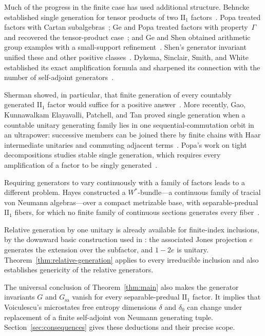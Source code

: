 Much of the progress in the finite case has used additional structure.
Behncke established single generation for tensor products of two
$\mathrm{II}_1$ factors~\cite{Behncke1972}.
Popa treated factors with Cartan subalgebras~\cite{Popa1985Cartan};
Ge and Popa treated factors with property~$\Gamma$ and recovered the
tensor-product case~\cite{GePopa1998}; and Ge and Shen obtained
arithmetic group examples with a small-support
refinement~\cite{GeShen2002}.
Shen's generator invariant unified these and other positive
classes~\cite{Shen2009}. Dykema, Sinclair, Smith, and White established
its exact amplification formula and sharpened its connection with the
number of self-adjoint generators~\cite{DSSW2008}.

Sherman showed, in particular, that finite generation of every
countably generated $\mathrm{II}_1$ factor would suffice for a positive
answer~\cite[Theorem~3.8(3)]{Sherman2012}.
More recently, Gao, Kunnawalkam Elayavalli, Patchell, and Tan proved
single generation when a countable unitary generating family lies in
one sequential-commutation orbit in an ultrapower: successive
members can be joined there by finite chains with Haar intermediate
unitaries and commuting adjacent terms~\cite[Theorem~A]{GaoEtAl2025}. Popa's work on tight
decompositions studies stable single generation, which requires every
amplification of a factor to be singly generated~\cite{Popa2021Tight}.

Requiring generators to vary continuously with a family of factors
leads to a different problem. Hayes constructed a $W^*$-bundle---a
continuous family of tracial von Neumann algebras---over a compact
metrizable base, with separable-predual $\mathrm{II}_1$ fibers, for
which no finite family of continuous sections generates every
fiber~\cite[Theorem~1.1]{Hayes2026Bundles}.

Relative generation by one unitary is already available for finite-index
inclusions, by the downward basic construction used in
\cite[Lemma~6.2]{DSSW2008}: the associated Jones projection $e$
generates the extension over the subfactor, and $1-2e$ is unitary.
Theorem~\ref{thm:relative-generation} applies to every irreducible
inclusion and also establishes genericity of the relative generators.

The universal conclusion of Theorem~\ref{thm:main} also makes the
generator invariants $G$ and $G_{\mathrm{sa}}$ vanish for every
separable-predual $\mathrm{II}_1$ factor. It implies that Voiculescu's
microstates free entropy dimensions $\delta$ and $\delta_0$ can change
under replacement of a finite self-adjoint von Neumann generating
tuple. Section~\ref{sec:consequences} gives these deductions and their
precise scope.

